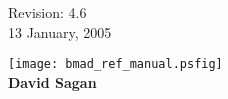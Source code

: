 \thispagestyle{empty}

\begin{flushright}
\large
  Revision: 4.6 \\
  13 January, 2005 \\
\end{flushright}

\vfill

{
\begin{center}
\texttt{[image: bmad\_ref\_manual.psfig]} \\
\vskip 0.3in
\huge\bf David Sagan
\end{center}
}

\vfill
\break